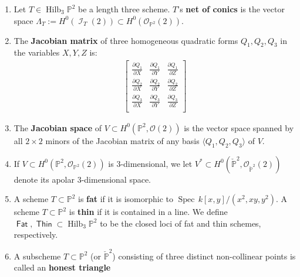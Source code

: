 \documentclass{article}
\renewcommand{\P}{\mathbb{P}}
\DeclareMathOperator{\Hilb}{Hilb}
\DeclareMathOperator{\I}{\mathcal{I}}
\renewcommand{\O}{\mathcal{O}}
\DeclareMathOperator{\Thin}{\mathsf{Thin}}
\DeclareMathOperator{\Fat}{\mathsf{Fat}}
\DeclareMathOperator{\spec}{Spec \,}
\begin{document}
\begin{definition}
  \label{definition:NetZ} 
  \begin{enumerate}
    \item Let $T \in \Hilb_{3}\P^{2}$ be a length three scheme. $T$'s {\bf net
    of conics} is the vector space
  $\Lambda_{T} := H^{0}(\I_{T}(2)) \subset H^{0}(\O_{\P^{2}}(2)).$
  \item The {\bf Jacobian matrix} of three homogeneous quadratic forms
  $Q_{1},Q_{2},Q_{3}$ in the variables $X,Y,Z$ is:
  \begin{eqnarray}\label{jacmatrix}
    \begin{bmatrix}
      \frac{\partial Q_{1}}{\partial X} & \frac{\partial Q_{1}}{\partial Y} & \frac{\partial Q_{1}}{\partial Z} \\
      \frac{\partial Q_{2}}{\partial X} & \frac{\partial Q_{2}}{\partial Y} & \frac{\partial Q_{2}}{\partial Z} \\
      \frac{\partial Q_{3}}{\partial X} & \frac{\partial Q_{3}}{\partial Y} & \frac{\partial Q_{3}}{\partial Z} \\
    \end{bmatrix}
  \end{eqnarray}
  \item The {\bf Jacobian space} of $V \subset H^{0}(\P^{2}, \O(2))$ is the vector space spanned by all $2 \times 2$ minors of the Jacobian matrix of any basis $\langle Q_{1}, Q_{2}, Q_{3} \rangle$ of $V$.
  \item If $V \subset H^{0}(\P^{2}, \O_{\P^{2}}(2))$ is $3$-dimensional, we
  let $V^{*} \subset H^{0}(\check{\P}^{2}, \O_{\check{\P}^{2}}(2))$ denote its apolar
  $3$-dimensional space.
  \item A scheme $T \subset \P^{2}$ is {\bf fat} if it is isomorphic to
  $\spec k[x,y]/(x^{2},xy,y^{2})$. A scheme $T \subset \P^{2}$ is {\bf
    thin} if it is contained in a line. We define $\Fat, \Thin \subset \Hilb_{3}\P^{2}$ to be the
  closed loci of fat and thin schemes, respectively.
  \item A subscheme $T \subset \P^{2}$ (or $\check{\P}^{2}$) consisting of three distinct non-collinear points is called an {\bf honest triangle}
  \end{enumerate}
\end{definition}
\end{document}
